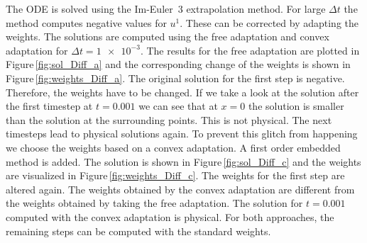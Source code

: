 \documentclass[a4paper]{article}
\numberwithin{equation}{section}
\theoremstyle{plain}
\theoremstyle{definition}
\numberwithin{theorem}{section}
\newcommand{\dt}{{\Delta t}}
\newcommand{\1}{\mathbbm{1}}
\begin{document}
The ODE is solved using the Im-Euler~3 extrapolation method.
For large $\dt$ the method computes negative values for $u^1$.
These can be corrected by adapting the weights.  
The solutions are computed using the free adaptation and convex adaptation for $\dt = \num{1e-3}$.
The results for the free adaptation are plotted in Figure\,\ref{fig:sol_Diff_a} and the corresponding change of the weights
is shown in Figure\,\ref{fig:weights_Diff_a}.
The original solution for the first step is negative. Therefore, the weights have to be changed. 
If we take a look at the solution after the first timestep at $t=0.001$ we can see that at $x=0$ the solution is smaller than the solution at the surrounding points.  
This is not physical.  
The next timesteps lead to physical solutions again. 
To prevent this glitch from happening we choose the weights based on a convex adaptation. 
A first order embedded method is added. The solution is shown in Figure\,\ref{fig:sol_Diff_c} and the weights are visualized in Figure\,\ref{fig:weights_Diff_c}.
The weights for the first step are altered again. 
The weights obtained by the convex adaptation are different from the weights obtained 
by taking the free adaptation. 
The solution for $t=0.001$ computed with the convex adaptation is physical. 
For both approaches, the remaining steps can be computed with the standard weights. 
\end{document}
